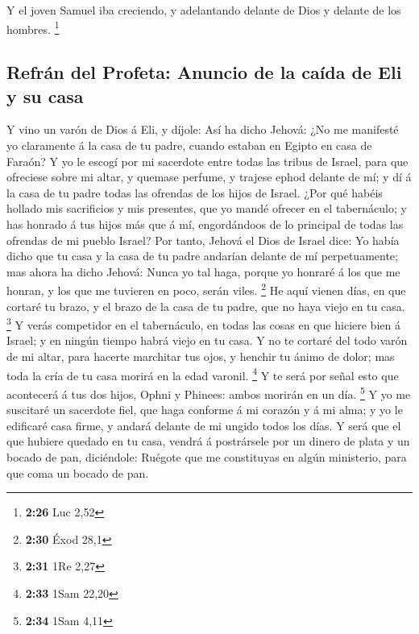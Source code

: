  Y el joven Samuel iba creciendo, y adelantando delante de
Dios y delante de los hombres. \footnote{\textbf{2:26} Luc 2,52}

\hypertarget{refruxe1n-del-profeta-anuncio-de-la-cauxedda-de-eli-y-su-casa}{%
\subsection{Refrán del Profeta: Anuncio de la caída de Eli y su
casa}\label{refruxe1n-del-profeta-anuncio-de-la-cauxedda-de-eli-y-su-casa}}

 Y vino un varón de Dios á Eli, y díjole: Así ha dicho
Jehová: ¿No me manifesté yo claramente á la casa de tu padre, cuando
estaban en Egipto en casa de Faraón?  Y yo le escogí por mi
sacerdote entre todas las tribus de Israel, para que ofreciese sobre mi
altar, y quemase perfume, y trajese ephod delante de mí; y dí á la casa
de tu padre todas las ofrendas de los hijos de Israel. 
¿Por qué habéis hollado mis sacrificios y mis presentes, que yo mandé
ofrecer en el tabernáculo; y has honrado á tus hijos más que á mí,
engordándoos de lo principal de todas las ofrendas de mi pueblo Israel?
 Por tanto, Jehová el Dios de Israel dice: Yo había dicho
que tu casa y la casa de tu padre andarían delante de mí perpetuamente;
mas ahora ha dicho Jehová: Nunca yo tal haga, porque yo honraré á los
que me honran, y los que me tuvieren en poco, serán viles. \footnote{\textbf{2:30}
  Éxod 28,1}  He aquí vienen días, en que cortaré tu brazo,
y el brazo de la casa de tu padre, que no haya viejo en tu casa.
\footnote{\textbf{2:31} 1Re 2,27}  Y verás competidor en el
tabernáculo, en todas las cosas en que hiciere bien á Israel; y en
ningún tiempo habrá viejo en tu casa.  Y no te cortaré del
todo varón de mi altar, para hacerte marchitar tus ojos, y henchir tu
ánimo de dolor; mas toda la cría de tu casa morirá en la edad varonil.
\footnote{\textbf{2:33} 1Sam 22,20}  Y te será por señal
esto que acontecerá á tus dos hijos, Ophni y Phinees: ambos morirán en
un día. \footnote{\textbf{2:34} 1Sam 4,11}  Y yo me
suscitaré un sacerdote fiel, que haga conforme á mi corazón y á mi alma;
y yo le edificaré casa firme, y andará delante de mi ungido todos los
días.  Y será que el que hubiere quedado en tu casa, vendrá
á postrársele por un dinero de plata y un bocado de pan, diciéndole:
Ruégote que me constituyas en algún ministerio, para que coma un bocado
de pan.

